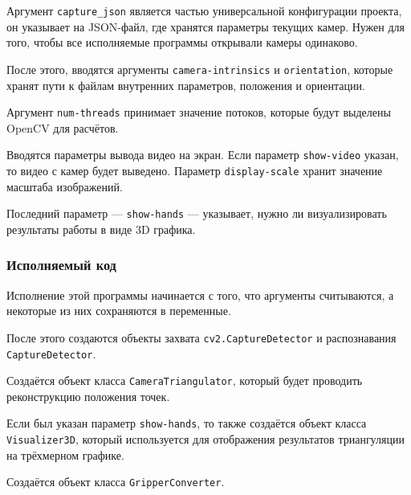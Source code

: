 \documentclass[14pt, a4paper]{extarticle}
\begin{document}
Аргумент \texttt{capture\_json} является частью универсальной конфигурации
проекта, он указывает на JSON-файл, где хранятся параметры текущих камер. Нужен
для того, чтобы все исполняемые программы открывали камеры одинаково.

После этого, вводятся аргументы \texttt{camera-intrinsics} и
\texttt{orientation}, которые хранят пути к файлам внутренних параметров,
положения и ориентации.

Аргумент \texttt{num-threads} принимает значение потоков, которые будут
выделены OpenCV для расчётов.

Вводятся параметры вывода видео на экран. Если параметр \texttt{show-video}
указан, то видео с камер будет выведено. Параметр \texttt{display-scale} хранит
значение масштаба изображений. 

Последний параметр --- \texttt{show-hands} --- указывает, нужно ли
визуализировать результаты работы в виде 3D графика.

\subsubsection{Исполняемый код}
Исполнение этой программы начинается с того, что аргументы считываются, а
некоторые из них сохраняются в переменные.

После этого создаются объекты захвата \texttt{cv2.CaptureDetector} и
распознавания \texttt{CaptureDetector}.

Создаётся объект класса \texttt{CameraTriangulator}, который будет проводить
реконструкцию положения точек. 

Если был указан параметр \texttt{show-hands}, то также создаётся объект класса
\texttt{Visualizer3D}, который используется для отображения результатов
триангуляции на трёхмерном графике.

Создаётся объект класса \texttt{GripperConverter}.
\end{document}
